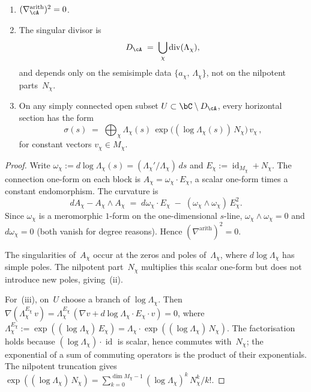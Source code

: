 \begin{theorem}%
\label{thm:packet-connection-flatness}%
\ClaimStatusProvedHere%
%
\begin{enumerate}[label=\textup{(\roman*)}]
\item $(\nabla_\cA^{\mathrm{arith}})^2 = 0$.
\item The singular divisor is
 \begin{equation}\label{eq:arithmetic-singular-divisor}
 D_\cA \;=\; \bigcup_\chi
 \operatorname{div}(\Lambda_\chi),
 \end{equation}
 and depends only on the semisimple data
 $\{a_\chi,\,\Lambda_\chi\}$, not on the nilpotent
 parts~$N_\chi$.
\item On any simply connected open subset
 $U \subset \bC \setminus D_\cA$, every horizontal section
 has the form
 \begin{equation}\label{eq:horizontal-sections}
 \sigma(s) \;=\; \bigoplus_\chi
 \Lambda_\chi(s)\,
 \exp\!\bigl((\log\Lambda_\chi(s))\,N_\chi\bigr)\,v_\chi\,,
 \end{equation}
 for constant vectors $v_\chi \in M_\chi$.
\end{enumerate}
\end{theorem}

\begin{proof}
Write $\omega_\chi := d\log\Lambda_\chi(s) =
(\Lambda_\chi'/\Lambda_\chi)\,ds$ and
$E_\chi := \operatorname{id}_{M_\chi} + N_\chi$.
The connection one-form on each block is
$A_\chi = \omega_\chi \cdot E_\chi$, a scalar one-form
times a constant endomorphism. The curvature is
\[
 dA_\chi - A_\chi \wedge A_\chi
 \;=\;
 d\omega_\chi \cdot E_\chi
 \;-\;
 (\omega_\chi \wedge \omega_\chi)\,E_\chi^2.
\]
Since $\omega_\chi$ is a meromorphic $1$-form on the
one-dimensional $s$-line, $\omega_\chi \wedge \omega_\chi = 0$
and $d\omega_\chi = 0$ (both vanish for degree reasons).
Hence $(\nabla^{\mathrm{arith}})^2 = 0$.

The singularities of~$A_\chi$ occur at the zeros and poles
of~$\Lambda_\chi$, where $d\log\Lambda_\chi$ has simple poles.
The nilpotent part~$N_\chi$ multiplies this scalar one-form but
does not introduce new poles, giving~(ii).

For~(iii), on~$U$ choose a branch of $\log\Lambda_\chi$.
Then $\nabla(\Lambda_\chi^{E_\chi}\,v)
= \Lambda_\chi^{E_\chi}\,(\nabla v + d\log\Lambda_\chi
\cdot E_\chi \cdot v) = 0$,
where $\Lambda_\chi^{E_\chi}
:= \exp((\log\Lambda_\chi)\,E_\chi)
= \Lambda_\chi\cdot\exp((\log\Lambda_\chi)\,N_\chi)$.
The factorisation holds because
$(\log\Lambda_\chi)\cdot\operatorname{id}$ is scalar,
hence commutes with~$N_\chi$; the exponential of a sum of
commuting operators is the product of their exponentials.
The nilpotent truncation gives
$\exp((\log\Lambda_\chi)\,N_\chi)
= \sum_{k=0}^{\dim M_\chi - 1}
(\log\Lambda_\chi)^k\,N_\chi^k / k!$.
\end{proof}

